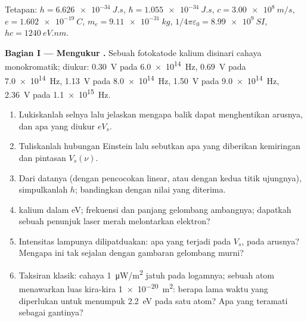 \begin{problem}
\label{pb:b1:quantum-introduction:1}
Tetapan: $h = \qty{6.626e-34}{J.s}$, $\hbar = \qty{1.055e-34}{J.s}$, $c =
\qty{3.00e8}{m/s}$, $e = \qty{1.602e-19}{C}$, $m_e = \qty{9.11e-31}{kg}$,
$1/4\pi\varepsilon_0 = \qty{8.99e9}{SI}$, $hc = \qty{1240}{eV.nm}$.

\medskip
\noindent\textbf{Bagian I --- Mengukur .}
Sebuah fotokatode kalium disinari cahaya monokromatik;  diukur: \qty{0.30}{V} pada \qty{6.0e14}{Hz}, \qty{0.69}{V} pada
\qty{7.0e14}{Hz}, \qty{1.13}{V} pada \qty{8.0e14}{Hz}, \qty{1.50}{V} pada
\qty{9.0e14}{Hz}, \qty{2.36}{V} pada \qty{1.1e15}{Hz}.
\begin{enumerate}
  \item Lukiskanlah selnya lalu jelaskan mengapa  balik dapat menghentikan
        arusnya, dan apa yang diukur $eV_s$.
  \item Tuliskanlah hubungan Einstein lalu sebutkan apa yang diberikan kemiringan dan
        pintasan $V_s(\nu)$.
  \item Dari datanya (dengan pencocokan linear, atau dengan kedua titik ujungnya),
        simpulkanlah $h$; bandingkan dengan nilai yang diterima.
  \item {} kalium dalam eV; frekuensi dan panjang gelombang
        ambangnya; dapatkah sebuah penunjuk laser merah melontarkan elektron?
  \item Intensitas lampunya dilipatduakan: apa yang terjadi pada $V_s$, pada
        arusnya? Mengapa ini tak sejalan dengan gambaran gelombang murni?
  \item Taksiran klasik: cahaya \qty{1}{\micro W/m^2} jatuh pada
        logamnya; sebuah atom menawarkan luas kira-kira \qty{1e-20}{m^2}: berapa lama
        waktu yang diperlukan untuk menumpuk \qty{2.2}{eV} pada satu atom? Apa yang
        teramati sebagai gantinya?
\end{enumerate}


\end{problem}
